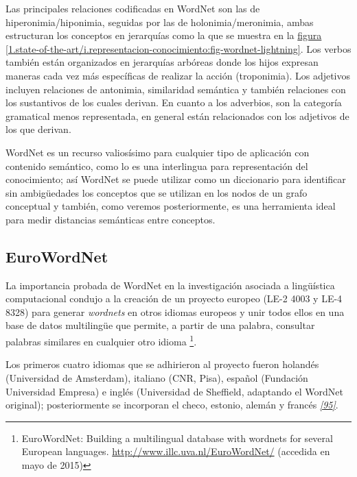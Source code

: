 \documentclass[a4paper,12pt,spanish]{book}
\begin{document}
Las principales relaciones codificadas en WordNet son las de hiperonimia/hiponimia, seguidas
por las de holonimia/meronimia, ambas estructuran los conceptos en jerarquías como la que
se muestra en la \hyperref[1.state-of-the-art/i.representacion-conocimiento:fig-wordnet-lightning]{figura  \ref*{1.state-of-the-art/i.representacion-conocimiento:fig-wordnet-lightning}}. Los verbos también están organizados
en jerarquías arbóreas donde los hijos expresan maneras cada vez más específicas de realizar
la acción (troponimia). Los adjetivos incluyen relaciones de antonimia, similaridad
semántica y también relaciones con los sustantivos de los cuales derivan. En cuanto a los
adverbios, son la categoría gramatical menos representada, en general están relacionados
con los adjetivos de los que derivan.

WordNet es un recurso valiosísimo para cualquier tipo de aplicación con contenido semántico,
como lo es una interlingua para representación del conocimiento; así WordNet se puede utilizar
como un diccionario para identificar sin ambigüedades los conceptos que se utilizan en los
nodos de un grafo conceptual y también, como veremos posteriormente, es una herramienta ideal
para medir distancias semánticas entre conceptos.


\subsection{EuroWordNet}
\label{1.state-of-the-art/i.representacion-conocimiento:eurowordnet}
La importancia probada de WordNet en la investigación asociada a lingüística computacional
condujo a la creación de un proyecto europeo (LE-2 4003 y LE-4 8328) para generar \emph{wordnets}
en otros idiomas europeos y unir todos ellos en una base de datos multilingüe que permite,
a partir de una palabra, consultar palabras similares en cualquier otro idioma \footnote{
EuroWordNet: Building a multilingual database with wordnets for several European
languages. \href{http://www.illc.uva.nl/EuroWordNet/}{http://www.illc.uva.nl/EuroWordNet/} (accedida en mayo de 2015)
}.

Los primeros cuatro idiomas que se adhirieron al proyecto fueron holandés (Universidad de
Amsterdam), italiano (CNR, Pisa), español (Fundación Universidad Empresa) e inglés (Universidad
de Sheffield, adaptando el WordNet original); posteriormente se incorporan el checo, estonio,
alemán y francés \label{1.state-of-the-art/i.representacion-conocimiento:id32}{\hyperref[zreferences:vossen1998]{\emph{{[}95{]}}}}.
\end{document}
